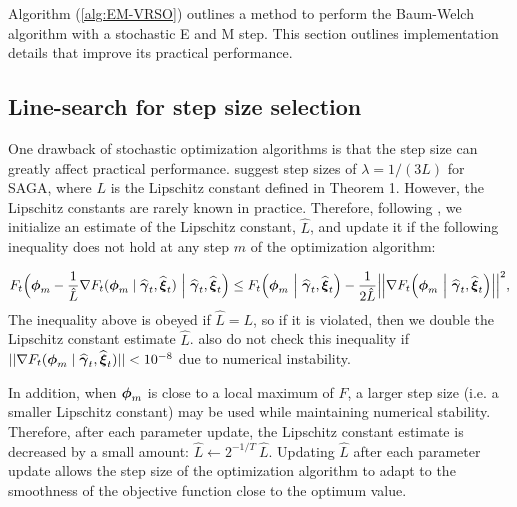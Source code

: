 
Algorithm (\ref{alg:EM-VRSO}) outlines a method to perform the Baum-Welch algorithm with a stochastic E and M step. This section outlines implementation details that improve its practical performance.

\subsection{Line-search for step size selection}
\label{subsec:est_L}

One drawback of stochastic optimization algorithms is that the step size can greatly affect practical performance. %
\citet{Defazio:2014} suggest step sizes of $\lambda = 1/(3L)$ for SAGA, where $L$ is the Lipschitz constant defined in Theorem 1. However, the Lipschitz constants are rarely known in practice. Therefore, following \citet{Schmidt:2017}, we initialize an estimate of the Lipschitz constant, $\hat L$, and update it if the following inequality does not hold at any step $m$ of the optimization algorithm:

\begin{gather}
    F_{t}\Big(\boldsymbol{\phi}_{m} - \frac{1}{\hat L}\nabla F_{t}(\boldsymbol{\phi}_{m}\mid \widehat {\boldsymbol{\gamma}}_{t}, \widehat {\boldsymbol{\xi}}_{t}) ~ \Big\vert ~ \widehat {\boldsymbol{\gamma}}_{t}, \widehat {\boldsymbol{\xi}}_{t} \Big) \leq F_{t}\Big(\boldsymbol{\phi}_{m} ~ \Big\vert ~ \widehat {\boldsymbol{\gamma}}_{t}, \widehat {\boldsymbol{\xi}}_{t}\Big) - \frac{1}{2 \hat L} \Big| \Big| \nabla F_{t}\Big(\boldsymbol{\phi}_{m} ~ \Big\vert ~ \widehat {\boldsymbol{\gamma}}_{t}, \widehat {\boldsymbol{\xi}}_{t}\Big) \Big| \Big| ^2,
    \label{ineq:F}
\end{gather}
%
The inequality above is obeyed if $\hat L = L$, so if it is violated, then we double the Lipschitz constant estimate $\hat L$. \citet{Schmidt:2017} also do not check this inequality if $||\nabla F_{t}(\boldsymbol{\phi}_{m} \mid \widehat {\boldsymbol{\gamma}}_{t}, \widehat {\boldsymbol{\xi}}_{t})|| < 10^{-8}$ due to numerical instability. 

In addition, when $\boldsymbol{\phi}_m$ is close to a local maximum of $F$, a larger step size (i.e. a smaller Lipschitz constant) may be used while maintaining numerical stability. Therefore, after each parameter update, the Lipschitz constant estimate is decreased by a small amount:
%
$\hat L \leftarrow 2^{-1/T} ~ \hat L$.
%
Updating $\hat L$ after each parameter update allows the step size of the optimization algorithm to adapt to the smoothness of the objective function close to the optimum value.

